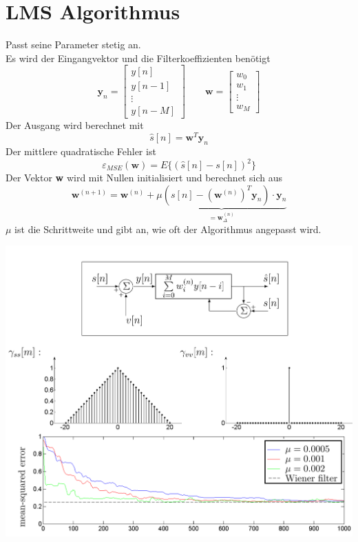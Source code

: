 \section{LMS Algorithmus}
Passt seine Parameter stetig an.\\
Es wird der Eingangvektor und die Filterkoeffizienten benötigt
\[ \textbf{y}_n = \begin{bmatrix}y[n] \\ y[n-1] \\ \vdots \\ y[n-M]
	\end{bmatrix} \qquad \textbf{w} = \begin{bmatrix}
		w_0 \\ w_1 \\ \vdots \\ w_M	\end{bmatrix} \]
Der Ausgang wird berechnet mit
\[ \hat{s}[n] = \textbf{w}^T\textbf{y}_n \]
Der mittlere quadratische Fehler ist
\[ \varepsilon_{MSE}(\textbf{w}) = E \{ (\hat{s}[n]-s[n])^2 \} \]
Der Vektor \textbf{w} wird mit Nullen initialisiert und berechnet sich aus
\[ \textbf{w}^{(n+1)} = \textbf{w}^{(n)} + \underbrace{\mu\left( s[n] - 
	\left( \textbf{w}^{(n)}\right)^T\textbf{y}_n\right)\cdot\textbf{y}_n}_
	{=\textbf{w}_\Delta^{(n)}} \]
$\mu$ ist die Schrittweite und gibt an, wie oft der Algorithmus angepasst wird.
\begin{center}
	\includegraphics[scale=.7]{./images/lms_algorithm}
\end{center}